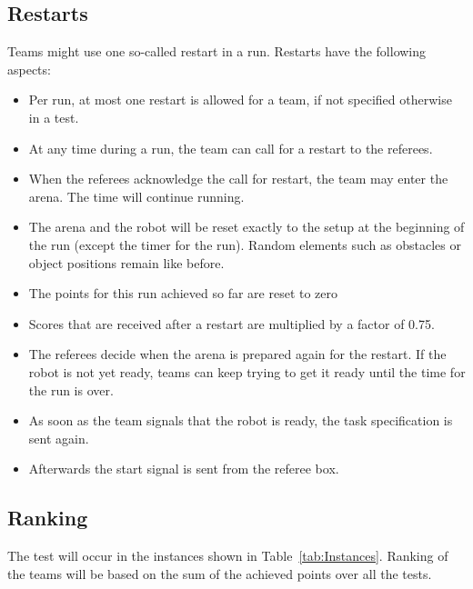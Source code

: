 \subsection{Restarts}
Teams might use one so-called restart in a run. Restarts have the following aspects:

\begin{itemize}

	\item Per run, at most one restart is allowed for a team, if not specified otherwise in a test.
	\item At any time during a run, the team can call for a restart to the referees.
	\item When the referees acknowledge the call for restart, the team may enter the arena. The time will continue running.
	\item The arena and the robot will be reset exactly to the setup at the beginning of the run (except the timer for the run). Random elements such as obstacles or object positions remain like before.
	\item The points for this run achieved so far are reset to zero
	\item Scores that are received after a restart are multiplied by a factor of 0.75.
	\item The referees decide when the arena is prepared again for the restart. If 	the robot is not yet ready, teams can keep trying to get it ready until the time for the run is over.
	\item As soon as the team signals that the robot is ready, the task specification is sent again.
	\item Afterwards the start signal is sent from the referee box.

\end{itemize}


\subsection{Ranking}

The test will occur in the instances shown in Table~\ref{tab:Instances}. Ranking of the teams will be based on the sum of the achieved points over all the tests.

\renewcommand{\arraystretch}{1.1}
\newcommand{\R}[2]{
	\begin{turn}{90}
		\begin{minipage}[][1em][c]{#2}
		#1
	  \end{minipage}
	\end{turn}
}

